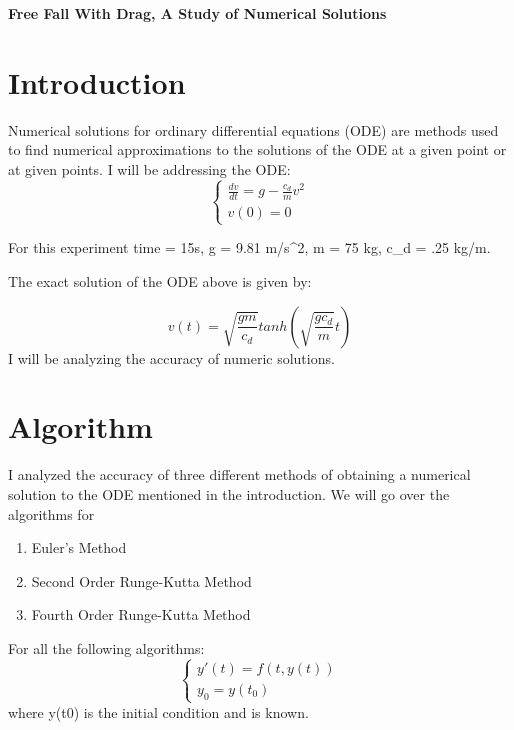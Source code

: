 \documentclass[12pt]{article}
\begin{document}
\centerline{\Large\textbf{Free Fall With Drag, A Study of Numerical Solutions}}
\vspace{.3cm}


\section{Introduction}\label{sec::Intro}
Numerical solutions for ordinary differential equations (ODE) are methods used to find numerical approximations to the solutions of the ODE at a given point or at given points. I will be addressing the ODE: 
\begin{equation}
\left\{ %
\begin{array}{cccc}
  \frac{dv}{dt} = g - \frac{c_d}{m}v^2 \\
  v(0) = 0
\end{array}
\right. %
\label{eq::curly}
\end{equation}

For this experiment time = 15s, g = 9.81 m/s^2, m = 75 kg, c_d = .25 kg/m. 

The exact solution of the ODE above is given by:

\begin{equation}
v(t) = \sqrt{\frac{gm}{c_d}}tanh(\sqrt{\frac{gc_d}{m}}t)
\end{equation}
I will be analyzing the accuracy of numeric solutions.

\section{Algorithm}
I analyzed the accuracy of three different methods of obtaining a numerical solution to the ODE mentioned in the introduction. 
We will go over the algorithms for
\begin{enumerate}
\item Euler's Method
\item Second Order Runge-Kutta Method
\item Fourth Order Runge-Kutta Method
\end{enumerate}
For all the following algorithms:
\begin{equation}
\left\{ %
\begin{array}{cccc}
  y'(t) = f(t,y(t)) \\
  y_0 = y(t_0)
\end{array}
\right. %
\label{eq::curly}
\end{equation}
where y(t0) is the initial condition and is known.
\end{document}
